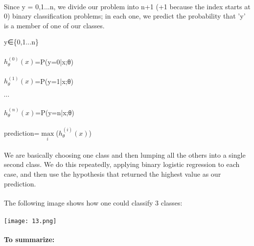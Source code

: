 \documentclass[UTF8]{ctexart}
\begin{document}
\paragraph{}
Since y = {0,1...n}, we divide our problem into n+1 (+1 because the index starts at 0) binary classification problems; in each one, we predict the probability that 'y' is a member of one of our classes.
\begin{algorithm}
y∈\{0,1...n\}
\paragraph{}
$h_{\theta}^{(0)}(x)$=P(y=0|x;θ)
\paragraph{}
$h_{\theta}^{(1)}(x)$=P(y=1|x;θ)
\paragraph{}
$\cdots$
\paragraph{}
$h_{\theta}^{(n)}(x)$=P(y=n|x;θ)
\paragraph{}
prediction=$\max \limits_{i}$($h_{\theta}^{(i)}(x)$)
\end{algorithm}
\paragraph{}
We are basically choosing one class and then lumping all the others into a single second class. We do this repeatedly, applying binary logistic regression to each case, and then use the hypothesis that returned the highest value as our prediction.
\paragraph{}
The following image shows how one could classify 3 classes:
\paragraph{}
\texttt{[image: 13.png]}
\paragraph{}
\textbf{To summarize:}
\end{document}

